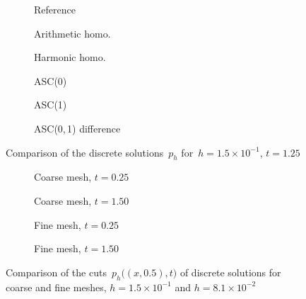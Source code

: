 \begin{figure}[h]
	\centering
	\begin{subfigure}{.3\linewidth}
		\centering
		\caption{Reference}
	\end{subfigure}%
	\hfill
	\begin{subfigure}{.3\linewidth}
		\centering
		\caption{Arithmetic homo.}	
	\end{subfigure}%
	\hfill
	\begin{subfigure}{.3\linewidth}
		\centering
		\caption{Harmonic homo.}	
	\end{subfigure}%
	\par
	\begin{subfigure}{.3\linewidth}
		\centering
		\caption{ASC(0)}
	\end{subfigure}%
	\hfill
	\begin{subfigure}{.3\linewidth}
		\centering
		\caption{ASC(1)}	
	\end{subfigure}%
	\hfill
	\begin{subfigure}{.3\linewidth}
		\centering
		\caption{ASC(0,\,1) difference}	
	\end{subfigure}%
	\caption{Comparison of the discrete solutions~$p_h$ for~$h = 1.5 \times 10^{-1}$, $t = 1.25$ \label{fig:transient:comp}}
\end{figure}
\begin{figure}[h]
 	\centering
 	\vskip 1cm
 	\begin{subfigure}{.45\linewidth}
 		\centering
 		\caption{Coarse mesh, $t = 0.25$}
 	\end{subfigure}%
 	\hfill
 	\begin{subfigure}{.45\linewidth}
 		\centering
 		\caption{Coarse mesh, $t = 1.50$}	
 	\end{subfigure}%
 	\par
 	\begin{subfigure}{.45\linewidth}
 		\centering
 		\caption{Fine mesh, $t = 0.25$}
 	\end{subfigure}%
 	\hfill
 	\begin{subfigure}{.45\linewidth}
 		\centering
		\caption{Fine mesh, $t = 1.50$}	
	\end{subfigure}%
	\caption{Comparison of the cuts~$p_h\big((x,0.5), t\big)$ of discrete solutions for coarse and fine meshes, $h = 1.5 \times 10^{-1}$ and $h = 8.1 \times 10^{-2}$ 		\label{fig:transient:cuts}}
\end{figure}

